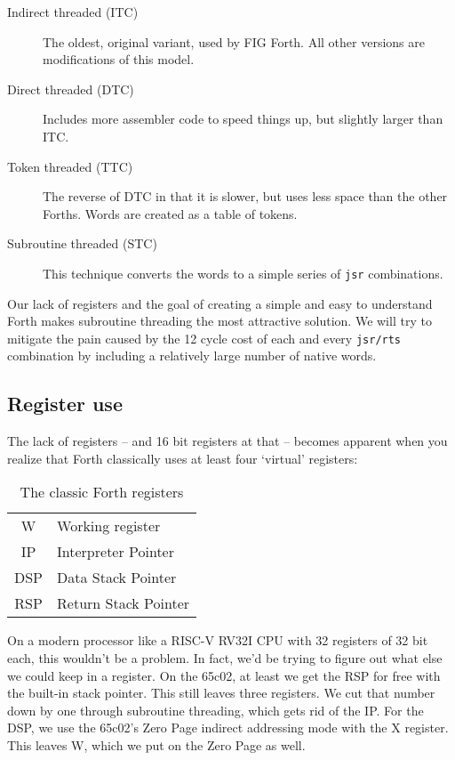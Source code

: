 \begin{description}
        \item [Indirect threaded (ITC)] The oldest, original variant, used by FIG
                Forth. All other versions are modifications of this 
                model.
        \item [Direct threaded (DTC)] Includes more assembler code to speed
                things up, but slightly larger than ITC. 
        \item [Token threaded (TTC)] The reverse of DTC in that it is slower, but uses
                less space than the other Forths. Words are created as a table
                of tokens.
        \item [Subroutine threaded (STC)] This technique converts the words to a simple
                series of \texttt{jsr} combinations. 
\end{description}

Our lack of registers and the goal of creating a simple and easy to understand
Forth makes subroutine threading the most attractive solution. We will try to
mitigate the pain caused by the 12 cycle cost of each and every \texttt{jsr/rts}
combination by including a relatively large number of native words. 

\subsection{Register use}

The lack of registers -- and 16 bit registers at that -- becomes apparent when
you realize that Forth classically uses at least four `virtual' registers:

\begin{table}[h !]
        \centering
        \label{tab:registers}
        \begin{tabular}{| c | l |}
                \hline
                W   & Working register\\
                IP  & Interpreter Pointer\\
                DSP & Data Stack Pointer\\
                RSP & Return Stack Pointer\\
                \hline
        \end{tabular}
        \caption{The classic Forth registers}
\end{table}

On a modern processor like a RISC-V RV32I CPU with 32 registers of
32 bit each, this wouldn't be a problem. In fact, we'd be trying to figure out
what else we could keep in a register. On the 65c02, at least we get the RSP for
free with the built-in stack pointer. This still leaves three registers. We cut
that number down by one through subroutine threading, which gets rid of the IP.
For the DSP, we use the 65c02's Zero Page indirect addressing
mode with the X register. This leaves W, which we put on the
Zero Page as well. 


